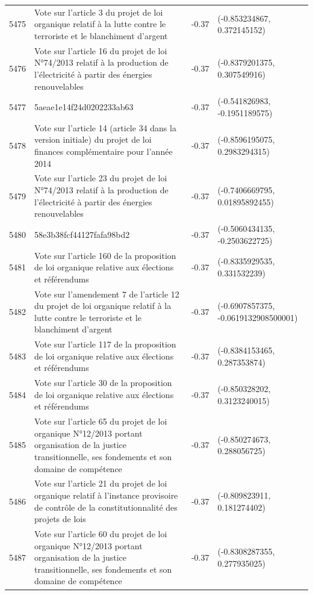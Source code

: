 \begin{table}[ht]
\begin{tabular}{rlrl}
  5475 & Vote sur l'article 3 du projet de loi organique relatif à la lutte contre le terroriste et le blanchiment d'argent & -0.37 & (-0.853234867, 0.372145152) \\ 
  5476 & Vote sur l'article 16 du projet de loi N°74/2013 relatif à la production de l'électricité à partir des énergies renouvelables & -0.37 & (-0.8379201375, 0.307549916) \\ 
  5477 & 5aeae1e14f24d0202233ab63 & -0.37 & (-0.541826983, -0.1951189575) \\ 
  5478 & Vote sur l'article 14 (article 34 dans la version initiale) du projet de loi finances complémentaire pour l'année 2014 & -0.37 & (-0.8596195075, 0.2983294315) \\ 
  5479 & Vote sur l'article 23 du projet de loi N°74/2013 relatif à la production de l'électricité à partir des énergies renouvelables & -0.37 & (-0.7406669795, 0.01895892455) \\ 
  5480 & 58e3b38fcf44127fafa98bd2 & -0.37 & (-0.5060434135, -0.2503622725) \\ 
  5481 & Vote sur l'article 160 de la proposition de loi organique relative aux élections et référendums & -0.37 & (-0.8335929535, 0.331532239) \\ 
  5482 & Vote sur l'amendement 7 de l'article 12 du projet de loi organique relatif à la lutte contre le terroriste et le blanchiment d'argent & -0.37 & (-0.6907857375, -0.0619132908500001) \\ 
  5483 & Vote sur l'article 117 de la proposition de loi organique relative aux élections et référendums & -0.37 & (-0.8384153465, 0.287353874) \\ 
  5484 & Vote sur l'article 30 de la proposition de loi organique relative aux élections et référendums & -0.37 & (-0.850328202, 0.3123240015) \\ 
  5485 & Vote sur l'article 65 du projet de loi organique N°12/2013 portant organisation de la justice transitionnelle, ses fondements et son domaine de compétence & -0.37 & (-0.850274673, 0.288056725) \\ 
  5486 & Vote sur l'article 21 du projet de loi organique relatif à l'instance provisoire de contrôle de la constitutionnalité des projets de lois & -0.37 & (-0.809823911, 0.181274402) \\ 
  5487 & Vote sur l'article 60 du projet de loi organique N°12/2013 portant organisation de la justice transitionnelle, ses fondements et son domaine de compétence & -0.37 & (-0.8308287355, 0.277935025) \\ 

\end{tabular}
\end{table}
